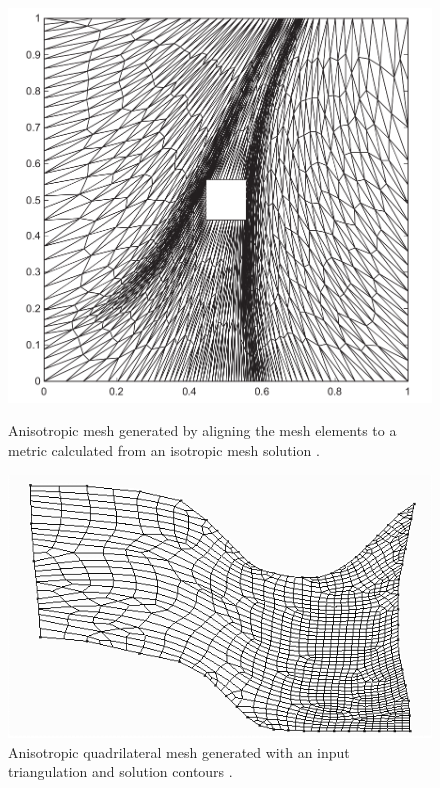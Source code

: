 \begin{figure}
\centering
\begin{minipage}[b]{.44\textwidth}
	\includegraphics[width=\linewidth]{img/intro/lit/anisotropicMeshAdaptation.png}
	\caption{Anisotropic mesh generated by aligning the mesh elements to a metric calculated from an isotropic mesh solution \cite{li2010anisotropic}.}
	\label{fig-anisotropicMeshAdaptation}
\end{minipage}\hfill
\begin{minipage}[b]{.44\textwidth}
	\includegraphics[width=\linewidth]{img/intro/lit/anisotropicQuadMesh.png}
	\caption{Anisotropic quadrilateral mesh generated with an input triangulation and solution contours \cite{viswanath2000quadrilateral}.}
	\label{fig-anisotropicQuadMesh}
\end{minipage}
\end{figure}


